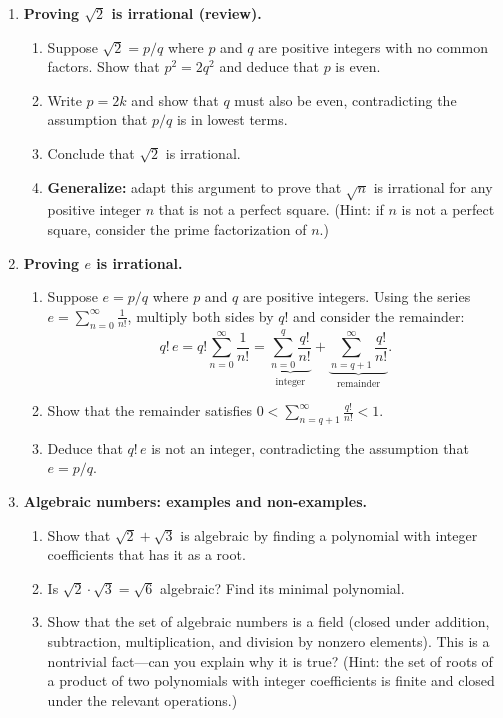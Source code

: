 \begin{enumerate}
    \item \textbf{Proving $\sqrt{2}$ is irrational (review).}
    \begin{enumerate}
        \item Suppose $\sqrt{2} = p/q$ where $p$ and $q$ are positive integers with no common factors. Show that $p^2 = 2q^2$ and deduce that $p$ is even.
        \item Write $p = 2k$ and show that $q$ must also be even, contradicting the assumption that $p/q$ is in lowest terms.
        \item Conclude that $\sqrt{2}$ is irrational.
        \item \textbf{Generalize:} adapt this argument to prove that $\sqrt{n}$ is irrational for any positive integer $n$ that is not a perfect square. (Hint: if $n$ is not a perfect square, consider the prime factorization of $n$.)
    \end{enumerate}

    \item \textbf{Proving $e$ is irrational.}
    \begin{enumerate}
        \item Suppose $e = p/q$ where $p$ and $q$ are positive integers. Using the series $e = \sum_{n=0}^{\infty} \frac{1}{n!}$, multiply both sides by $q!$ and consider the remainder:
        \[
            q! \, e = q! \sum_{n=0}^{\infty} \frac{1}{n!} = \underbrace{\sum_{n=0}^{q} \frac{q!}{n!}}_{\text{integer}} + \underbrace{\sum_{n=q+1}^{\infty} \frac{q!}{n!}}_{\text{remainder}}.
        \]
        \item Show that the remainder satisfies $0 < \sum_{n=q+1}^{\infty} \frac{q!}{n!} < 1$.
        \item Deduce that $q! \, e$ is not an integer, contradicting the assumption that $e = p/q$.
    \end{enumerate}

    \item \textbf{Algebraic numbers: examples and non-examples.}
    \begin{enumerate}
        \item Show that $\sqrt{2} + \sqrt{3}$ is algebraic by finding a polynomial with integer coefficients that has it as a root.
        \item Is $\sqrt{2} \cdot \sqrt{3} = \sqrt{6}$ algebraic? Find its minimal polynomial.
        \item Show that the set of algebraic numbers is a field (closed under addition, subtraction, multiplication, and division by nonzero elements). This is a nontrivial fact---can you explain why it is true? (Hint: the set of roots of a product of two polynomials with integer coefficients is finite and closed under the relevant operations.)
    \end{enumerate}


\end{enumerate}

